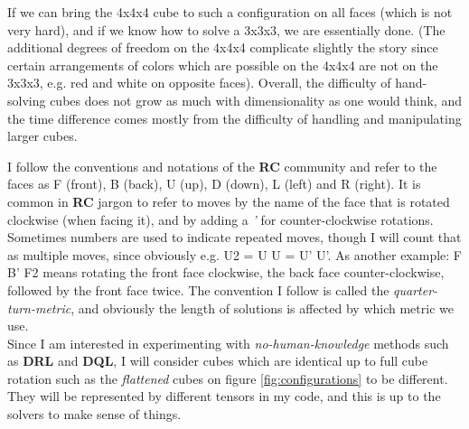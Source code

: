 \noindent If we can bring the 4x4x4 cube to such a configuration on all faces (which is not very hard), and if we know how to solve a 3x3x3, we are essentially done. (The additional degrees of freedom on the 4x4x4 complicate slightly the story since certain arrangements of colors which are possible on the 4x4x4 are not on the 3x3x3, e.g. red and white on opposite faces). Overall, the difficulty of hand-solving cubes does not grow as much with dimensionality as one would think, and the time difference comes mostly from the difficulty of handling and manipulating larger cubes.




I follow the conventions and notations of the \textbf{RC} community and refer to the faces as F (front), B (back), U (up), D (down), L (left) and R (right). It is common in \textbf{RC} jargon to refer to moves  by the name of the face that is rotated clockwise (when facing it), and by adding a \textit{'} for counter-clockwise rotations. Sometimes numbers are used to indicate repeated moves, though I will count that as multiple moves, since obviously e.g. U2 = U U = U' U'. As another example: F B' F2 means rotating the front face clockwise, the back face counter-clockwise, followed by the front face twice. The convention I follow is called the \textit{quarter-turn-metric}, and obviously the length of solutions is affected by which metric we use.
\\
Since I am interested in experimenting with \textit{no-human-knowledge} methods such as \textbf{DRL} and \textbf{DQL}, I will consider cubes which are identical up to full cube rotation such as the \textit{flattened} cubes on figure \ref{fig:configurations} to be different. They will be represented by different tensors in my code, and this is up to the solvers to make sense of things.

